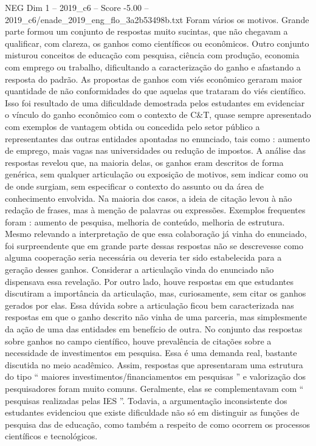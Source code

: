 \begin{textsample}{NEG Dim 1 – 2019\_c6 – Score -5.00 – 2019\_c6/enade\_2019\_eng\_flo\_3a2b53498b.txt}
Foram vários os motivos.
Grande parte formou um conjunto de respostas muito sucintas, que não chegavam a qualificar, com clareza, os ganhos como científicos ou econômicos.
Outro conjunto misturou conceitos de educação com pesquisa, ciência com produção, economia com emprego ou trabalho, dificultando a caracterização do ganho e afastando a resposta do padrão.
As propostas de ganhos com viés econômico geraram maior quantidade de não conformidades do que aquelas que trataram do viés científico.
Isso foi resultado de uma dificuldade demostrada pelos estudantes em evidenciar o vínculo do ganho econômico com o contexto de C\&T, quase sempre apresentado com exemplos de vantagem obtida ou concedida pelo setor público a representantes das outras entidades apontadas no enunciado, tais como : aumento de emprego, mais vagas nas universidades ou redução de impostos.
A análise das respostas revelou que, na maioria delas, os ganhos eram descritos de forma genérica, sem qualquer articulação ou exposição de motivos, sem indicar como ou de onde surgiam, sem especificar o contexto do assunto ou da área de conhecimento envolvida.
Na maioria dos casos, a ideia de citação levou à não redação de frases, mas à menção de palavras ou expressões.
Exemplos frequentes foram : aumento de pesquisa, melhoria de conteúdo, melhoria de estrutura.
Mesmo relevando a interpretação de que essa colaboração já vinha do enunciado, foi surpreendente que em grande parte dessas respostas não se descrevesse como alguma cooperação seria necessária ou deveria ter sido estabelecida para a geração desses ganhos.
Considerar a articulação vinda do enunciado não dispensava essa revelação.
Por outro lado, houve respostas em que estudantes discutiram a importância da articulação, mas, curiosamente, sem citar os ganhos gerados por elas.
Essa dúvida sobre a articulação ficou bem caracterizada nas respostas em que o ganho descrito não vinha de uma parceria, mas simplesmente da ação de uma das entidades em benefício de outra.
No conjunto das respostas sobre ganhos no campo científico, houve prevalência de citações sobre a necessidade de investimentos em pesquisa.
Essa é uma demanda real, bastante discutida no meio acadêmico.
Assim, respostas que apresentaram uma estrutura do tipo “ maiores investimentos/financiamentos em pesquisas ” e valorização dos pesquisadores foram muito comuns.
Geralmente, elas se complementavam com “ pesquisas realizadas pelas IES ”.
Todavia, a argumentação inconsistente dos estudantes evidenciou que existe dificuldade não só em distinguir as funções de pesquisa das de educação, como também a respeito de como ocorrem os processos científicos e tecnológicos.

\end{textsample}

